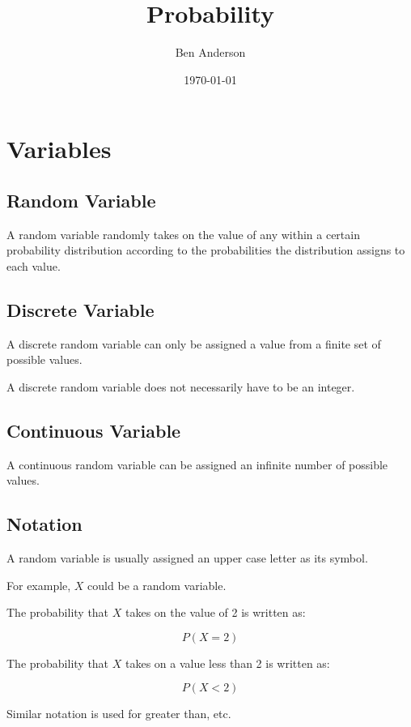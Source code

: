 \documentclass[a4paper,11pt]{article}
\begin{document}
\title{Probability}
\author{Ben Anderson}
\date{\today}
\maketitle
\pagebreak

\tableofcontents
\pagebreak


\section{Variables}

\subsection{Random Variable}

A random variable randomly takes on the value of any within a certain
probability distribution according to the probabilities the distribution assigns
to each value.


\subsection{Discrete Variable}

A discrete random variable can only be assigned a value from a finite set of
possible values.

A discrete random variable does not necessarily have to be an integer.


\subsection{Continuous Variable}

A continuous random variable can be assigned an infinite number of possible
values.


\subsection{Notation}

A random variable is usually assigned an upper case letter as its symbol.

For example, $X$ could be a random variable.

The probability that $X$ takes on the value of 2 is written as:

$$
P(X = 2)
$$

The probability that $X$ takes on a value less than 2 is written as:

$$
P(X < 2)
$$

Similar notation is used for greater than, etc.
\end{document}
